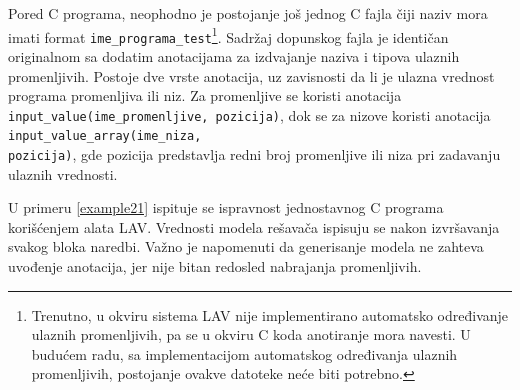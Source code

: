 \documentclass[12pt,oneside]{memoir}
\begin{document}
Pored C programa, neophodno je postojanje još jednog C fajla
čiji naziv mora imati format \texttt{ime\_programa\_test}\footnote{Trenutno, u okviru sistema LAV nije implementirano automatsko određivanje ulaznih promenljivih, pa se u okviru C koda anotiranje mora navesti. U budućem radu, sa implementacijom automatskog određivanja ulaznih promenljivih, postojanje ovakve datoteke neće biti potrebno.}. Sadržaj dopunskog fajla je identičan originalnom sa dodatim anotacijama za izdvajanje naziva i tipova ulaznih promenljivih. Postoje dve vrste anotacija, uz zavisnosti da li je ulazna vrednost programa promenljiva ili niz. Za promenljive se koristi anotacija 
\texttt{input\_value(ime\_promenljive, pozicija)}, dok se za nizove koristi 
anotacija \texttt{input\_value\_array(ime\_niza, \\pozicija)}, gde pozicija predstavlja redni broj promenljive ili niza pri zadavanju ulaznih vrednosti. 
\par
U primeru \ref{example21} ispituje se ispravnost jednostavnog C programa korišćenjem alata LAV. Vrednosti modela rešavača ispisuju se nakon izvršavanja svakog bloka naredbi. Važno je napomenuti da generisanje modela ne zahteva uvođenje anotacija, jer nije bitan redosled nabrajanja promenljivih. 
\end{document}
